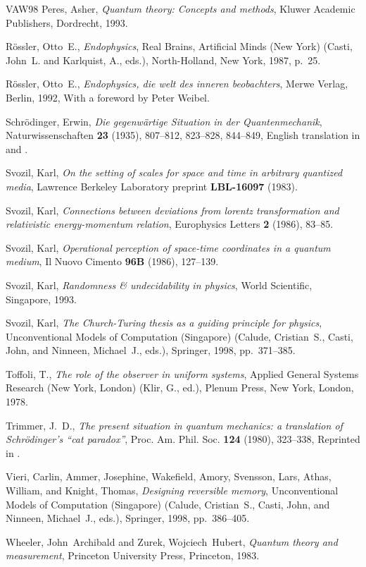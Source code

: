 \begin{thebibliography}{VAW{\etalchar{+}}98}
Peres, Asher, {\em Quantum theory: Concepts and methods}, Kluwer Academic
  Publishers, Dordrecht, 1993.

R{\"{o}}ssler, Otto~E., {\em Endophysics}, Real Brains, Artificial Minds (New
  York) (Casti, John~L. and Karlquist, A., eds.), North-Holland, New York,
  1987, p.~25.

R{\"{o}}ssler, Otto~E., {\em Endophysics, die welt des inneren beobachters},
  Merwe Verlag, Berlin, 1992, With a foreword by Peter Weibel.

Schr{\"{o}}dinger, Erwin, {\em Die gegenw{\"{a}}rtige {S}ituation in der
  {Q}uantenmechanik}, Naturwissenschaften {\bf 23} (1935), 807--812, 823--828,
  844--849, English translation in \cite{trimmer} and \cite[pp.
  152-167]{wheeler-Zurek:83}.

Svozil, Karl, {\em On the setting of scales for space and time in arbitrary
  quantized media}, Lawrence Berkeley Laboratory preprint {\bf LBL-16097}
  (1983).

Svozil, Karl, {\em Connections between deviations from lorentz transformation
  and relativistic energy-momentum relation}, Europhysics Letters {\bf 2}
  (1986), 83--85.

Svozil, Karl, {\em Operational perception of space-time coordinates in a
  quantum medium}, Il Nuovo Cimento {\bf 96B} (1986), 127--139.

Svozil, Karl, {\em Randomness \& undecidability in physics}, World Scientific,
  Singapore, 1993.

Svozil, Karl, {\em The {C}hurch-{T}uring thesis as a guiding principle for
  physics}, Unconventional Models of Computation (Singapore) (Calude,
  Cristian~S., Casti, John, and Ninneen, Michael~J., eds.), Springer, 1998,
  pp.~371--385.

Toffoli, T., {\em The role of the observer in uniform systems}, Applied General
  Systems Research (New York, London) (Klir, G., ed.), Plenum Press, New York,
  London, 1978.

Trimmer, J.~D., {\em The present situation in quantum mechanics: a translation
  of {S}chr{\"{o}}dinger's ``cat paradox''}, Proc. Am. Phil. Soc. {\bf 124}
  (1980), 323--338, Reprinted in \cite[pp. 152-167]{wheeler-Zurek:83}.

Vieri, Carlin, Ammer, Josephine, Wakefield, Amory, Svensson, Lars, Athas,
  William, and Knight, Thomas, {\em Designing reversible memory},
  Unconventional Models of Computation (Singapore) (Calude, Cristian~S., Casti,
  John, and Ninneen, Michael~J., eds.), Springer, 1998, pp.~386--405.

Wheeler, John~Archibald and Zurek, Wojciech~Hubert, {\em Quantum theory and
  measurement}, Princeton University Press, Princeton, 1983.

\end{thebibliography}



